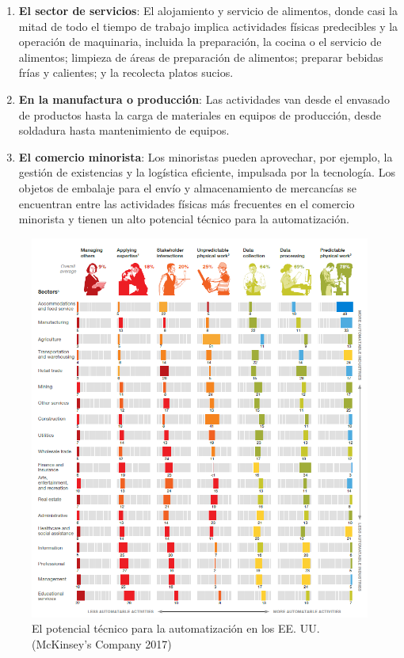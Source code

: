     
    \begin{enumerate}
        \item \textbf{El sector de servicios}: El alojamiento y servicio de alimentos, donde casi la mitad de todo el tiempo de trabajo implica actividades físicas predecibles y la operación de maquinaria, incluida la preparación, la cocina o el servicio de alimentos; limpieza de áreas de preparación de alimentos; preparar bebidas frías y calientes; y la recolecta platos sucios. 
        \item \textbf{En la manufactura o producción}: Las actividades van desde el envasado de productos hasta la carga de materiales en equipos de producción, desde soldadura hasta mantenimiento de equipos.
        \item \textbf{El comercio minorista}: Los minoristas pueden aprovechar, por ejemplo, la gestión de existencias y la logística eficiente, impulsada por la tecnología. Los objetos de embalaje para el envío y almacenamiento de mercancías se encuentran entre las actividades físicas más frecuentes en el comercio minorista y tienen un alto potencial técnico para la automatización.
    \end{enumerate}

    \begin{figure}[h]
        \centering
        \includegraphics[width=0.97\linewidth]{Main/Chapter2/Images2/potencial-automatisacion.png}
        \caption{El potencial técnico para la automatización en los EE. UU. (McKinsey’s Company 2017) \cite{mckinsey_jobs}}
        \label{f:Cap2_general_potencial_automatizacion}
    \end{figure}
  
